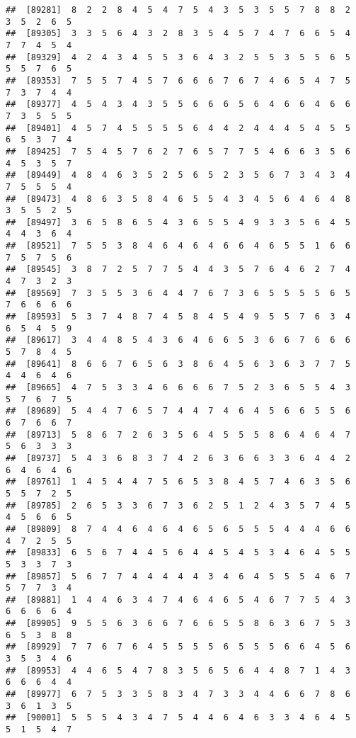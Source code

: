 \documentclass[
]{book}
\begin{document}
\begin{verbatim}
##  [89281]  8  2  2  8  4  5  4  7  5  4  3  5  3  5  5  7  8  8  2  3  5  2  6  5
##  [89305]  3  3  5  6  4  3  2  8  3  5  4  5  7  4  7  6  6  5  4  7  7  4  5  4
##  [89329]  4  2  4  3  4  5  5  3  6  4  3  2  5  5  3  5  5  6  5  5  5  7  6  5
##  [89353]  7  5  5  7  4  5  7  6  6  6  7  6  7  4  6  5  4  7  5  7  3  7  4  4
##  [89377]  4  5  4  3  4  3  5  5  6  6  6  5  6  4  6  6  4  6  6  7  3  5  5  5
##  [89401]  4  5  7  4  5  5  5  5  6  4  4  2  4  4  4  5  4  5  5  6  5  3  7  4
##  [89425]  7  5  4  5  7  6  2  7  6  5  7  7  5  4  6  6  3  5  6  4  5  3  5  7
##  [89449]  4  8  4  6  3  5  2  5  6  5  2  3  5  6  7  3  4  3  4  7  5  5  5  4
##  [89473]  4  8  6  3  5  8  4  6  5  5  4  3  4  5  6  4  6  4  8  3  5  5  2  5
##  [89497]  3  6  5  8  6  5  4  3  6  5  5  4  9  3  3  5  6  4  5  4  4  3  6  4
##  [89521]  7  5  5  3  8  4  6  4  6  4  6  6  4  6  5  5  1  6  6  7  5  7  5  6
##  [89545]  3  8  7  2  5  7  7  5  4  4  3  5  7  6  4  6  2  7  4  4  7  3  2  3
##  [89569]  7  3  5  5  3  6  4  4  7  6  7  3  6  5  5  5  5  6  5  7  6  6  6  6
##  [89593]  5  3  7  4  8  7  4  5  8  4  5  4  9  5  5  7  6  3  4  6  5  4  5  9
##  [89617]  3  4  4  8  5  4  3  6  4  6  6  5  3  6  6  7  6  6  6  5  7  8  4  5
##  [89641]  8  6  6  7  6  5  6  3  8  6  4  5  6  3  6  3  7  7  5  4  4  6  4  6
##  [89665]  4  7  5  3  3  4  6  6  6  6  7  5  2  3  6  5  5  4  3  5  7  6  7  5
##  [89689]  5  4  4  7  6  5  7  4  4  7  4  6  4  5  6  6  5  5  6  6  7  6  6  7
##  [89713]  5  8  6  7  2  6  3  5  6  4  5  5  5  8  6  4  6  4  7  5  6  3  3  3
##  [89737]  5  4  3  6  8  3  7  4  2  6  3  6  6  3  3  6  4  4  2  6  4  6  4  6
##  [89761]  1  4  5  4  4  7  5  6  5  3  8  4  5  7  4  6  3  5  6  5  5  7  2  5
##  [89785]  2  6  5  3  3  6  7  3  6  2  5  1  2  4  3  5  7  4  5  4  5  6  6  5
##  [89809]  8  7  4  4  6  4  6  4  6  5  6  5  5  5  4  4  4  6  6  4  7  2  5  5
##  [89833]  6  5  6  7  4  4  5  6  4  4  5  4  5  3  4  6  4  5  5  5  3  3  7  3
##  [89857]  5  6  7  7  4  4  4  4  4  3  4  6  4  5  5  5  4  6  7  5  7  7  3  4
##  [89881]  1  4  4  6  3  4  7  4  6  4  6  5  4  6  7  7  5  4  3  6  6  6  6  4
##  [89905]  9  5  5  6  3  6  6  7  6  6  5  5  8  6  3  6  7  5  3  6  5  3  8  8
##  [89929]  7  7  6  7  6  4  5  5  5  5  6  5  5  5  6  6  4  5  6  3  5  3  4  6
##  [89953]  4  4  6  5  4  7  8  3  5  6  5  6  4  4  8  7  1  4  3  6  6  6  4  4
##  [89977]  6  7  5  3  3  5  8  3  4  7  3  3  4  4  6  6  7  8  6  3  6  1  3  5
##  [90001]  5  5  5  4  3  4  7  5  4  4  6  4  6  3  3  4  6  4  5  5  1  5  4  7

\end{verbatim}
\end{document}
